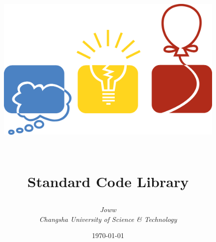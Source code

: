 

\title{{~\\[28pt]\begin{figure}[th!]
\centering
\includegraphics[width=\linewidth]{icpc-logo}
\end{figure}~\\[20pt] \ttitleff \bfseries Standard Code Library\\[12pt]}}


\author{\consolff \itshape Joww\\[10pt]
\timesnew \itshape Changsha University of Science \& Technology}

\date{\today}%

{\maketitle\thispagestyle{empty}}